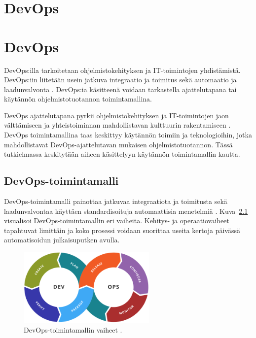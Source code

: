 \chapter{DevOps\label{devops}}

\chapter{DevOps\label{devops}}

DevOps:illa tarkoitetaan ohjelmistokehityksen ja IT-toimintojen yhdistämistä.
DevOps:iin liitetään usein jatkuva integraatio ja toimitus sekä automaatio ja laadunvalvonta \cite{Jabbari16, Leite19}.
DevOps:ia käsitteenä voidaan tarkastella ajattelutapana tai käytännön ohjelmistotuotannon toimintamallina.

DevOps ajattelutapana pyrkii ohjelmistokehityksen ja IT-toimintojen jaon välttämiseen ja yhteistoiminnan mahdollistavan kulttuurin rakentamiseen \cite{Klein21}.
DevOps toimintamallina taas keskittyy käytännön toimiin ja teknologioihin, jotka mahdollistavat DevOps-ajattelutavan mukaisen ohjelmistotuotannon.
Tässä tutkielmassa keskitytään aiheen käsittelyyn käytännön toimintamallin kautta.

\section{DevOps-toimintamalli}

DevOps-toimintamalli painottaa jatkuvaa integraatiota ja toimitusta sekä laadunvalvontaa käyttäen standardisoituja automaattisia menetelmiä \cite{Leite19}.
Kuva~\ref{fig:devops} visualisoi DevOps-toimintamallin eri vaiheita.
Kehitys- ja operaatiovaiheet tapahtuvat limittäin ja koko prosessi voidaan suorittaa useita kertoja päivässä automatisoidun julkaisuputken avulla.

\begin{figure}[ht]
\begin{center}
\includegraphics[width=0.6\textwidth]{figures/devops_toolchain.png}
\caption{DevOps-toimintamallin vaiheet \cite{Wikimedia23}\label{fig:devops}.}
\end{center}
\end{figure}

